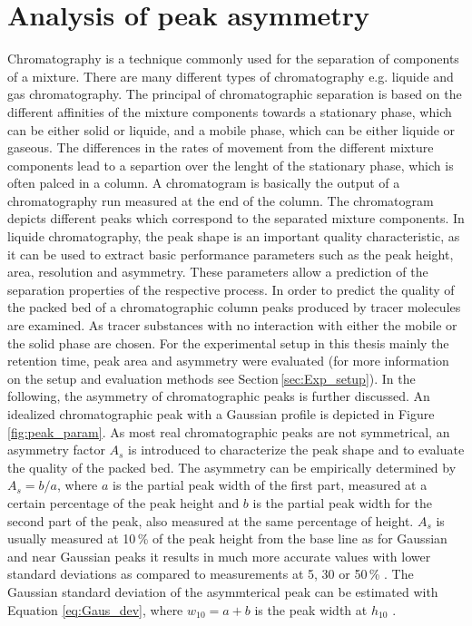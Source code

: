 \section{Analysis of peak asymmetry}
\label{sec:peak_as}
Chromatography is a technique commonly used for the separation of components of a mixture. There are many different types of chromatography e.g. liquide and gas chromatography. The principal of chromatographic separation is based on the different affinities of the mixture components towards a stationary phase, which can be either solid or liquide, and a mobile phase, which can be either liquide or gaseous. The differences in the rates of movement from the different mixture components lead to a separtion over the lenght of the stationary phase, which is often palced in a column. A chromatogram is basically the output of a chromatography run measured at the end of the column. The chromatogram depicts different peaks which correspond to the separated mixture components. In liquide chromatography, the peak shape is an important quality characteristic, as it can be used to extract basic performance parameters such as the peak height, area, resolution and asymmetry. These parameters allow a prediction of the separation properties of the respective process. In order to predict the quality of the packed bed of a chromatographic column peaks produced by tracer molecules are examined. As tracer substances with no interaction with either the mobile or the solid phase are chosen. For the experimental setup in this thesis mainly the retention time, peak area and asymmetry were evaluated (for more information on the setup and evaluation methods see Section\,\ref{sec:Exp_setup}). In the following, the asymmetry of chromatographic peaks is further discussed. \newline 
An idealized chromatographic peak with a Gaussian profile is depicted in Figure\,\ref{fig:peak_param}. As most real chromatographic peaks are not symmetrical, an asymmetry factor $A_{s}$ is introduced to characterize the peak shape and to evaluate the quality of the packed bed. The asymmetry can be empirically determined by $A_{s}=b/a$, where $a$ is the partial peak width of the first part, measured at a certain percentage of the peak height and $b$ is the partial peak width for the second part of the peak, also measured at the same percentage of height. $A_{s}$ is usually measured at 10\,\% of the peak height from the base line as for Gaussian and near Gaussian peaks it results in much more accurate values with lower standard deviations as compared to measurements at 5, 30 or 50\,\% \cite{foley1983equations}. The Gaussian standard deviation of the asymmterical peak can be estimated with Equation \ref{eq:Gaus_dev}, where $w_{10}=a+b$ is the peak width at $h_{10}$ \cite{papai2002analysis}.  

